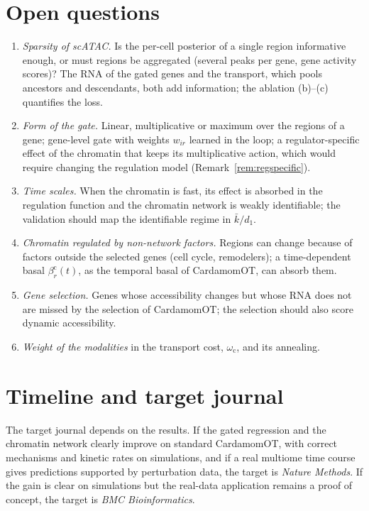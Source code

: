 \documentclass[a4paper, 11pt]{article}
\newcommand{\bc}{\beta^{\mathrm{c}}}
\theoremstyle{plain}
\theoremstyle{remark}
\begin{document}
\section{Open questions}\label{sec:open}

\begin{enumerate}[nosep]
\item \emph{Sparsity of scATAC.} Is the per-cell posterior of a single region informative enough, or must regions be aggregated (several peaks per gene, gene activity scores)? The RNA of the gated genes and the transport, which pools ancestors and descendants, both add information; the ablation (b)--(c) quantifies the loss.
\item \emph{Form of the gate.} Linear, multiplicative or maximum over the regions of a gene; gene-level gate with weights $w_{ir}$ learned in the loop; a regulator-specific effect of the chromatin that keeps its multiplicative action, which would require changing the regulation model (Remark~\ref{rem:regspecific}).
\item \emph{Time scales.} When the chromatin is fast, its effect is absorbed in the regulation function and the chromatin network is weakly identifiable; the validation should map the identifiable regime in $\bar k/d_1$.
\item \emph{Chromatin regulated by non-network factors.} Regions can change because of factors outside the selected genes (cell cycle, remodelers); a time-dependent basal $\bc_r(t)$, as the temporal basal of CardamomOT, can absorb them.
\item \emph{Gene selection.} Genes whose accessibility changes but whose RNA does not are missed by the selection of CardamomOT; the selection should also score dynamic accessibility.
\item \emph{Weight of the modalities} in the transport cost, $\omega_{\mathrm c}$, and its annealing.
\end{enumerate}

\section{Timeline and target journal}\label{sec:timeline}

The target journal depends on the results. If the gated regression and the chromatin network clearly improve on standard CardamomOT, with correct mechanisms and kinetic rates on simulations, and if a real multiome time course gives predictions supported by perturbation data, the target is \emph{Nature Methods}. If the gain is clear on simulations but the real-data application remains a proof of concept, the target is \emph{BMC Bioinformatics}.
\end{document}
